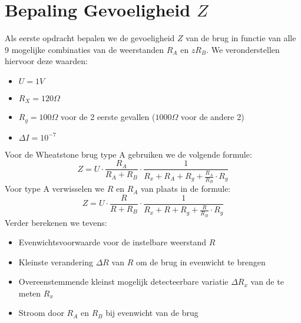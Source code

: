 \section{Bepaling Gevoeligheid $Z$}
Als eerste opdracht bepalen we de gevoeligheid $Z$ van de brug in functie van alle 9 mogelijke combinaties
van de weerstanden $R_A$ en $zR_B$. We veronderstellen hiervoor deze waarden:
\begin{itemize}
    \item $U = 1 V$
    \item $R_X = 120 \Omega$
    \item $R_g = 100 \Omega$ voor de 2 eerste gevallen ($1000 \Omega$ voor de andere 2)
    \item $\Delta I = 10^{-7}$
\end{itemize}
Voor de Wheatstone brug type A gebruiken we de volgende formule:
\begin{equation}
    Z = U \cdot \frac{R_A}{R_A + R_B} \cdot \frac{1}{R_x + R_A + R_g + \frac{R_A}{R_B}\cdot R_g}
\end{equation}
Voor type A verwisselen we $R$ en $R_A$ van plaats in de formule:
\begin{equation}
    Z = U \cdot \frac{R}{R + R_B} \cdot \frac{1}{R_x + R + R_g + \frac{R}{R_B}\cdot R_g}
\end{equation}
Verder berekenen we tevens:
\begin{itemize}
    \item Evenwichtsvoorwaarde voor de instelbare weerstand $R$
    \item Kleinste verandering $\Delta R$ van $R$ om de brug in evenwicht te brengen
    \item Overeenstemmende kleinst mogelijk detecteerbare variatie $\Delta R_x$ van de te meten $R_x$ 
    \item Stroom door $R_A$ en $R_B$ bij evenwicht van de brug
\end{itemize}